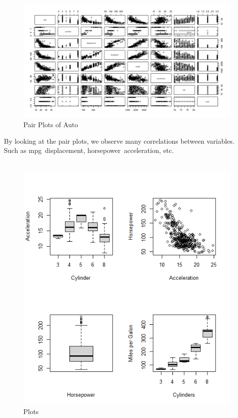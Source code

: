 \documentclass{article}
\begin{document}
\begin{figure}[h]
    \centering
    \includegraphics[width=1.25\linewidth]{Auto Pairs.png}
    \caption{Pair Plots of Auto}
    \label{fig:enter-label}
\end{figure}
By looking at the pair plots, we observe many correlations between variables. Such as mpg~displacement, horsepower~acceleration, etc. \\ \\

\begin{figure}
    \centering
    \includegraphics[width=1.25\linewidth]{Auto Plots.png}
    \caption{Plots}
    \label{fig:enter-label}
\end{figure}
\end{document}
